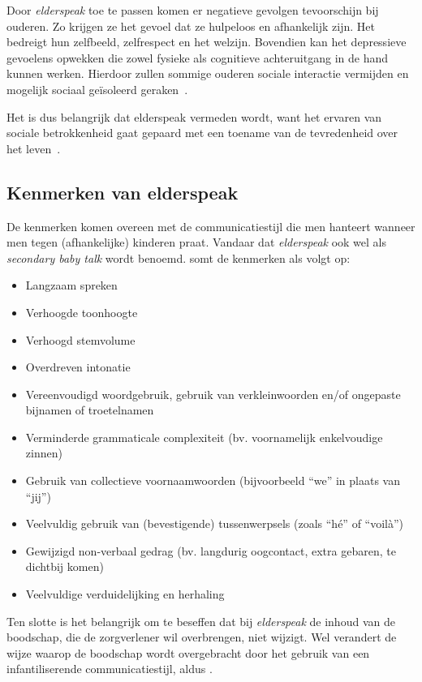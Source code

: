 Door \textit{elderspeak} toe te passen komen er negatieve gevolgen tevoorschijn bij ouderen. Zo krijgen ze het gevoel dat ze hulpeloos en afhankelijk zijn. Het bedreigt hun zelfbeeld, zelfrespect en het welzijn. Bovendien kan het depressieve gevoelens opwekken die zowel fysieke als cognitieve achteruitgang in de hand kunnen werken. Hierdoor zullen sommige ouderen sociale interactie vermijden en mogelijk sociaal geïsoleerd geraken~\autocite{Campens2021}.

Het is dus belangrijk dat elderspeak vermeden wordt, want het ervaren van sociale betrokkenheid gaat gepaard met een toename van de tevredenheid over het leven~\autocite{Campens2021}.

\subsection{Kenmerken van elderspeak}
De kenmerken komen overeen met de communicatiestijl die men hanteert wanneer men tegen (afhankelijke) kinderen praat. Vandaar dat \textit{elderspeak} ook wel als \textit{secondary baby talk} wordt benoemd. \textcite{Campens2021} somt de kenmerken als volgt op:

\begin{itemize}
    \item Langzaam spreken
    \item Verhoogde toonhoogte
    \item Verhoogd stemvolume
    \item Overdreven intonatie
    \item Vereenvoudigd woordgebruik, gebruik van verkleinwoorden en/of ongepaste bijnamen of troetelnamen
    \item Verminderde grammaticale complexiteit (bv. voornamelijk enkelvoudige zinnen)
    \item Gebruik van collectieve voornaamwoorden (bijvoorbeeld ``we'' in plaats van ``jij'')
    \item Veelvuldig gebruik van (bevestigende) tussenwerpsels (zoals ``hé'' of ``voilà'')
    \item Gewijzigd non-verbaal gedrag (bv. langdurig oogcontact, extra gebaren, te dichtbij komen)
    \item Veelvuldige verduidelijking en herhaling
\end{itemize}

Ten slotte is het belangrijk om te beseffen dat bij \textit{elderspeak} de inhoud van de boodschap, die de zorgverlener wil overbrengen, niet wijzigt. Wel verandert de wijze waarop de boodschap wordt overgebracht door het gebruik van een infantiliserende communicatiestijl, aldus \textcite{Campens2021}.


